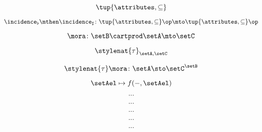 \begin{forslides}
     \begin{equation}
        \label{eq:slides_adjunctions_44}
       \tup{\attributes, \subseteq}
    \end{equation}
    
     \begin{equation}
        \label{eq:slides_adjunctions_45}
       \incidence_\flat \mthen \incidence_\sharp \colon \tup{\attributes, \subseteq}\op \mto \tup{\attributes, \subseteq}\op
    \end{equation}
    
    \begin{equation}
        \label{eq:slides_adjunctions_46}
       \mora \colon \setB \cartprod \setA \mto \setC
    \end{equation}
    
     \begin{equation}
        \label{eq:slides_adjunctions_47}
       \stylenat{\tau}_{\setA,\setC}
    \end{equation}
    
     \begin{equation}
        \label{eq:slides_adjunctions_48}
        \stylenat{\tau}\mora \colon \setA \sto \setC^\setB
    \end{equation}
    
     \begin{equation}
        \label{eq:slides_adjunctions_49}
       \setAel \mapsto f( -, \setAel)
    \end{equation}
    
     \begin{equation}
        \label{eq:slides_adjunctions_50}
       ...
    \end{equation}
    
     \begin{equation}
        \label{eq:slides_adjunctions_51}
       ...
    \end{equation}
    
     \begin{equation}
        \label{eq:slides_adjunctions_52}
       ...
    \end{equation}
    
    \begin{equation}
        \label{eq:slides_adjunctions_53}
       ...
    \end{equation}
    
     \begin{equation}
        \label{eq:slides_adjunctions_54}
       ...
    \end{equation}
    

\end{forslides}
